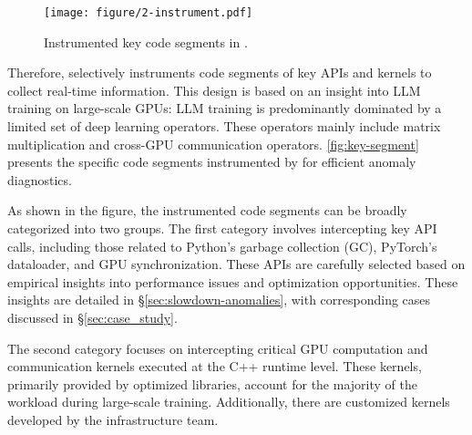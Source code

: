 \begin{figure}
    \centering
    \texttt{[image: figure/2-instrument.pdf]}
    \caption{Instrumented key code segments in \sysname{}.}
    \label{fig:key-segment}
    \vspace{-4mm}
\end{figure}

Therefore, \sysname{} selectively instruments code segments of key APIs and kernels to collect real-time information. This design is based on an insight into LLM training on large-scale GPUs: LLM training is predominantly dominated by a limited set of deep learning operators. These operators mainly include matrix multiplication and cross-GPU communication operators. \autoref{fig:key-segment} presents the specific code segments instrumented by \sysname{} for efficient anomaly diagnostics.


As shown in the figure, the instrumented code segments can be broadly categorized into two groups. The first category involves intercepting key API calls, including those related to Python’s garbage collection (GC), PyTorch’s dataloader, and GPU synchronization. These APIs are carefully selected based on empirical insights into performance issues and optimization opportunities. These insights are detailed in \S\ref{sec:slowdown-anomalies}, with corresponding cases discussed in \S\ref{sec:case_study}.

The second category focuses on intercepting critical GPU computation and communication kernels executed at the C++ runtime level. These kernels, primarily provided by optimized libraries\cite{cublas2024,daoFlashAttentionFast,daoFlashAttention2Faster,nccl2024}, account for the majority of the workload during large-scale training. Additionally, there are customized kernels developed by the infrastructure team.

